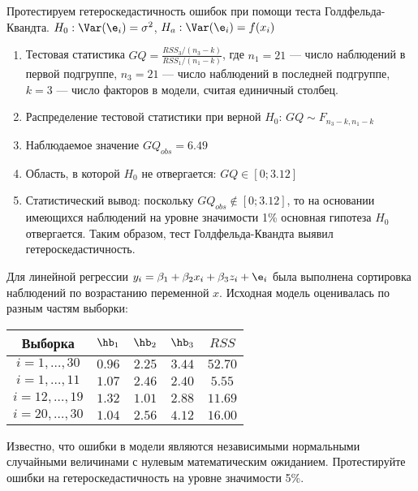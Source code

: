 \documentclass[pdftex,11pt,openany]{book}\usepackage[]{graphicx}\usepackage[]{color}
\begin{document}
\begin{solution}
Протестируем гетероскедастичность ошибок при помощи теста Голдфельда-
Квандта. $H_0: \Var(\e_i)=\sigma^2$, $H_a: \Var(\e_i)=f(x_i)$

\begin{enumerate}
\item Тестовая статистика $GQ=\frac{RSS_3/(n_3-k)}{RSS_1/(n_1-k)}$, где $n_1=21$ --- число наблюдений в первой подгруппе, $n_3=21$ --- число наблюдений в
последней подгруппе, $k=3$ --- число факторов в модели, считая единичный столбец.
\item Распределение тестовой статистики при верной $H_0$: $GQ\sim F_{n_3-k,n_1-k}$
\item Наблюдаемое значение $GQ_{obs}=6.49$
\item Область, в которой $H_0$ не отвергается: $GQ\in [0;3.12]$
\item Статистический вывод: поскольку $GQ_{obs} \notin [0;3.12]$, то на основании имеющихся наблюдений на уровне значимости 1\% основная гипотеза $H_0$ отвергается. Таким образом, тест Голдфельда-Квандта выявил гетероскедастичность.
\end{enumerate}
\end{solution}


\begin{problem}
Для линейной регрессии $y_i = \beta_1 + \beta_2 x_i + \beta_3 z_i + \e_i$ была
выполнена сортировка наблюдений по возрастанию переменной $x$. Исходная модель оценивалась по разным частям выборки:

\begin{tabular}{c|cccc}
Выборка & $\hb_1$ & $\hb_2$ & $\hb_3$ & $RSS$ \\
\hline
$i=1,\ldots, 30$ & $0.96$ & $2.25$ & $3.44$ & $52.70$ \\
$i=1,\ldots, 11$ & $1.07$ & $2.46$ & $2.40$ & $5.55$ \\
$i=12,\ldots, 19$ & $1.32$ & $1.01$ & $2.88$ & $11.69$ \\
$i=20,\ldots, 30$ & $1.04$ & $2.56$ & $4.12$ & $16.00$ \\
\end{tabular}

Известно, что ошибки в модели являются независимыми нормальными случайными величинами с нулевым математическим ожиданием. Протестируйте
ошибки на гетероскедастичность на уровне значимости 5\%.
\end{problem}
\end{document}
